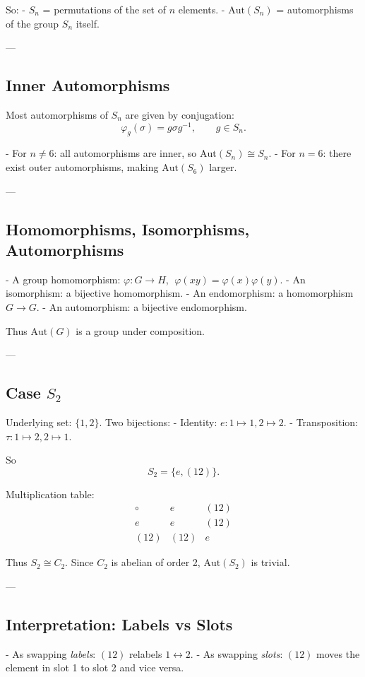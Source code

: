 \documentclass[12pt]{article}
\begin{document}
	So:
	- $S_n$ = permutations of the set of $n$ elements.  
	- $\mathrm{Aut}(S_n)$ = automorphisms of the group $S_n$ itself.  
	
	---
	
	\subsection*{Inner Automorphisms}
	Most automorphisms of $S_n$ are given by conjugation:
	$$
	\varphi_g(\sigma) = g\sigma g^{-1}, \qquad g \in S_n.
	$$
	
	- For $n \neq 6$: all automorphisms are inner, so $\mathrm{Aut}(S_n) \cong S_n$.  
	- For $n=6$: there exist outer automorphisms, making $\mathrm{Aut}(S_6)$ larger.
	
	---
	
	\subsection*{Homomorphisms, Isomorphisms, Automorphisms}
	- A group homomorphism: $\varphi: G \to H$, $\;\varphi(xy) = \varphi(x)\varphi(y)$.  
	- An isomorphism: a bijective homomorphism.  
	- An endomorphism: a homomorphism $G \to G$.  
	- An automorphism: a bijective endomorphism.  
	
	Thus $\mathrm{Aut}(G)$ is a group under composition.
	
	---
	
	\subsection*{Case $S_2$}
	Underlying set: $\{1,2\}$.  
	Two bijections:
	- Identity: $e: 1\mapsto 1, 2\mapsto 2$.  
	- Transposition: $\tau: 1\mapsto 2, 2\mapsto 1$.
	
	So
	$$
	S_2 = \{ e, (12)\}.
	$$
	
	Multiplication table:
	$$
	\begin{array}{c|cc}
		\circ & e & (12) \\ \hline
		e & e & (12) \\
		(12) & (12) & e
	\end{array}
	$$
	
	Thus $S_2 \cong C_2$.  
	Since $C_2$ is abelian of order 2, $\mathrm{Aut}(S_2)$ is trivial.
	
	---
	
	\subsection*{Interpretation: Labels vs Slots}
	- As swapping \emph{labels}: $(12)$ relabels $1 \leftrightarrow 2$.  
	- As swapping \emph{slots}: $(12)$ moves the element in slot 1 to slot 2 and vice versa.  
	
\end{document}
